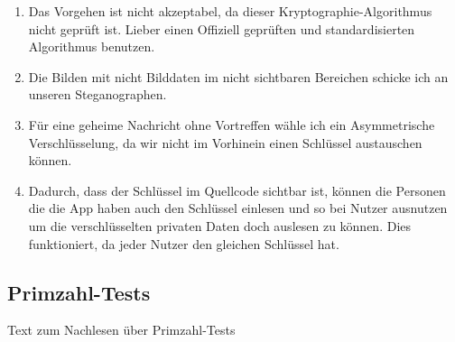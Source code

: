\documentclass[a4paper]{article}
\begin{document}
\begin{enumerate}
    \item Das Vorgehen ist nicht akzeptabel, da dieser Kryptographie-Algorithmus nicht geprüft ist. Lieber einen Offiziell geprüften und standardisierten Algorithmus benutzen.
    \item Die Bilden mit nicht Bilddaten im nicht sichtbaren Bereichen schicke ich an unseren Steganographen.
    \item Für eine geheime Nachricht ohne Vortreffen wähle ich ein Asymmetrische Verschlüsselung, da wir nicht im Vorhinein einen Schlüssel austauschen können.
    \item Dadurch, dass der Schlüssel im Quellcode sichtbar ist, können die Personen die die App haben auch den Schlüssel einlesen und so bei Nutzer ausnutzen um die verschlüsselten privaten Daten doch auslesen zu können. Dies funktioniert, da jeder Nutzer den gleichen Schlüssel hat.
\end{enumerate}

\subsection{Primzahl-Tests}


Text zum Nachlesen über Primzahl-Tests
\end{document}
